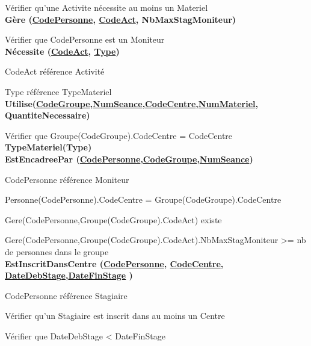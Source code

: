 \documentclass[10pt]{article}
\begin{document}
\begin{small}
    \hspace{1cm}Vérifier qu’une Activite nécessite au moins un Materiel\\   

\textbf{Gère (\underline{CodePersonne}, \underline{CodeAct}, NbMaxStagMoniteur)}

\hspace{1cm}Vérifier que CodePersonne est un Moniteur\\

\textbf{Nécessite (\underline{CodeAct}, \underline{Type})}

    \hspace{1cm}CodeAct référence Activité
    
    \hspace{1cm}Type référence TypeMateriel\\

\textbf{Utilise(\underline{CodeGroupe},\underline{NumSeance},\underline{CodeCentre},\underline{NumMateriel}, QuantiteNecessaire)}
    
    \hspace{1cm}Vérifier que Groupe(CodeGroupe).CodeCentre = CodeCentre\\

\textbf{TypeMateriel(Type)}\\

\textbf{EstEncadreePar (\underline{CodePersonne},\underline{CodeGroupe},\underline{NumSeance})}

    \hspace{1cm}CodePersonne référence Moniteur
    
    \hspace{1cm}Personne(CodePersonne).CodeCentre = Groupe(CodeGroupe).CodeCentre
    
    \hspace{1cm}Gere(CodePersonne,Groupe(CodeGroupe).CodeAct) existe
    
    \hspace{1cm}Gere(CodePersonne,Groupe(CodeGroupe).CodeAct).NbMaxStagMoniteur >= nb de personnes dans le groupe\\

\textbf{EstInscritDansCentre (\underline{CodePersonne}, \underline{CodeCentre}, \underline{DateDebStage},\underline{DateFinStage} )}
    
    \hspace{1cm}CodePersonne référence Stagiaire
    
    \hspace{1cm}Vérifier qu’un Stagiaire est inscrit dans au moins un Centre
    
    \hspace{1cm}Vérifier que DateDebStage < DateFinStage \\
    
\end{small}
\end{document}
